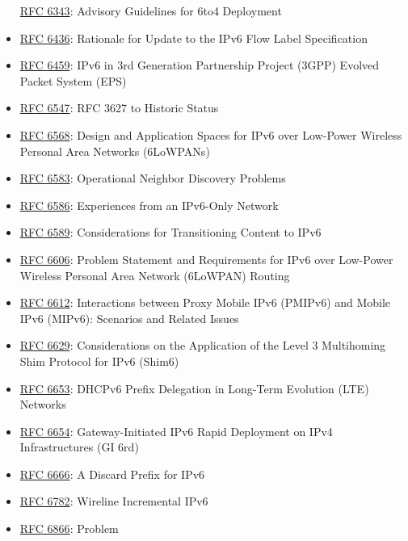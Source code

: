 \documentclass[
]{article}
\begin{document}
\begin{itemize}
  \href{https://www.rfc-editor.org/info/rfc6343}{RFC 6343}: Advisory
  Guidelines for 6to4 Deployment
\item
  \href{https://www.rfc-editor.org/info/rfc6436}{RFC 6436}: Rationale
  for Update to the IPv6 Flow Label Specification
\item
  \href{https://www.rfc-editor.org/info/rfc6459}{RFC 6459}: IPv6 in 3rd
  Generation Partnership Project (3GPP) Evolved Packet System (EPS)
\item
  \href{https://www.rfc-editor.org/info/rfc6547}{RFC 6547}: RFC 3627 to
  Historic Status
\item
  \href{https://www.rfc-editor.org/info/rfc6568}{RFC 6568}: Design and
  Application Spaces for IPv6 over Low-Power Wireless Personal Area
  Networks (6LoWPANs)
\item
  \href{https://www.rfc-editor.org/info/rfc6583}{RFC 6583}: Operational
  Neighbor Discovery Problems
\item
  \href{https://www.rfc-editor.org/info/rfc6586}{RFC 6586}: Experiences
  from an IPv6-Only Network
\item
  \href{https://www.rfc-editor.org/info/rfc6589}{RFC 6589}:
  Considerations for Transitioning Content to IPv6
\item
  \href{https://www.rfc-editor.org/info/rfc6606}{RFC 6606}: Problem
  Statement and Requirements for IPv6 over Low-Power Wireless Personal
  Area Network (6LoWPAN) Routing
\item
  \href{https://www.rfc-editor.org/info/rfc6612}{RFC 6612}: Interactions
  between Proxy Mobile IPv6 (PMIPv6) and Mobile IPv6 (MIPv6): Scenarios
  and Related Issues
\item
  \href{https://www.rfc-editor.org/info/rfc6629}{RFC 6629}:
  Considerations on the Application of the Level 3 Multihoming Shim
  Protocol for IPv6 (Shim6)
\item
  \href{https://www.rfc-editor.org/info/rfc6653}{RFC 6653}: DHCPv6
  Prefix Delegation in Long-Term Evolution (LTE) Networks
\item
  \href{https://www.rfc-editor.org/info/rfc6654}{RFC 6654}:
  Gateway-Initiated IPv6 Rapid Deployment on IPv4 Infrastructures (GI
  6rd)
\item
  \href{https://www.rfc-editor.org/info/rfc6666}{RFC 6666}: A Discard
  Prefix for IPv6
\item
  \href{https://www.rfc-editor.org/info/rfc6782}{RFC 6782}: Wireline
  Incremental IPv6
\item
  \href{https://www.rfc-editor.org/info/rfc6866}{RFC 6866}: Problem

\end{itemize}
\end{document}
